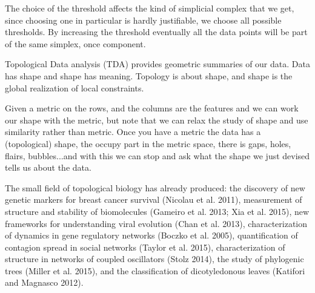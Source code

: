 \documentclass[onecollarge,runningheads]{svjour2}
\begin{document}
The choice of the threshold affects the kind of simplicial complex that we get, since choosing one in particular is hardly justifiable, we choose all possible thresholds. By increasing the threshold eventually all the data points will be part of the same simplex, once component.

Topological Data analysis (TDA) provides geometric summaries of our data. Data has shape and shape has meaning.
Topology is about shape, and shape is the global realization of local constraints. %

Given a metric on the rows, and the columns are the features and we can work our shape with the metric, but note that we can relax the study of shape and use similarity rather than metric.
Once you have a metric the data has a (topological) shape, the occupy part in the metric space, there is gaps, holes, flairs, bubbles...and with this we can stop and ask what the shape we just devised tells us about the data.

The small field of topological biology has already produced: the discovery of new genetic markers for breast cancer survival (Nicolau et al. 2011), measurement of structure and stability of biomolecules (Gameiro et al. 2013; Xia et al. 2015), new frameworks for understanding viral evolution (Chan et al. 2013), characterization of dynamics in gene regulatory networks (Boczko et al. 2005), quantification of contagion spread in social networks (Taylor et al. 2015), characterization of structure in networks of coupled oscillators (Stolz 2014), the study of phylogenic trees (Miller et al. 2015), and the classification of dicotyledonous leaves (Katifori and Magnasco 2012).
\end{document}
